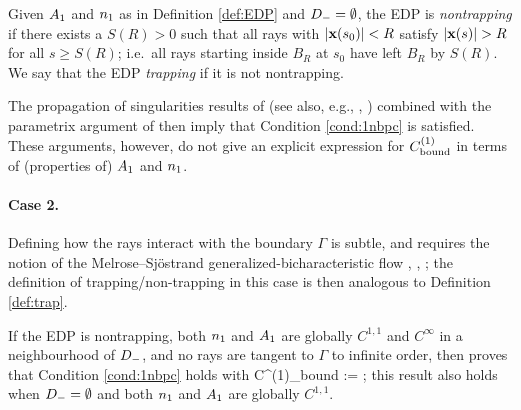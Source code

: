 \begin{definition}\label{def:trap}
Given $A_{1}$ and $n_{1}$ as in Definition \ref{def:EDP} and $D_{-}=\emptyset$, the EDP is \emph{nontrapping} if 
there exists a $S(R)>0$ such that all rays with $|\mathbf{x}(s_0)|<R$ satisfy $|\bx(s)|>R$ for all $s\geq S(R)$; i.e.~all rays starting inside $B_R$ at $s_0$ have left $B_R$ by $S(R)$. 
We say that the EDP \emph{trapping} if it is not nontrapping.
\end{definition}

The propagation of singularities results of \cite[\S VI]{DuHo:72} (see also, e.g., \cite[Chapter 24]{Ho:85}, \cite[\S12.3]{Zw:12}) combined with the parametrix argument of \cite{Va:75} then imply that Condition \ref{cond:1nbpc} is satisfied. These arguments, however, do not give an explicit expression for $C^{(1)}_{\rm bound}$ in terms of (properties of) $A_{1}$ and $n_{1}$.

\paragraph{Case 2.}
Defining how the rays interact with the boundary $\Gamma$ is subtle, and requires the notion of the Melrose--Sj{\"o}strand generalized-bicharacteristic flow 
\cite[\S24.3]{Ho:85}, \cite{MeSj:78}, \cite{MeSj:82}; the definition of trapping/non-trapping in this case \cite[Definition 7.20]{MeSj:82} is then analogous to Definition \ref{def:trap}.

If the EDP is nontrapping, both $n_{1}$ and $A_{1}$ are globally $C^{1,1}$ and $C^\infty$ in a neighbourhood of $D_{-}$, and no rays are tangent to $\Gamma$ to infinite order, 
then \cite[Theorem 2 and Equation 6.32]{GaSpWu:18} proves that Condition \ref{cond:1nbpc} holds with
\beqs
C^{(1)}_{\rm bound} :=   ;
\eeqs
this result also holds when $D_{-}=\emptyset$ and both $n_{1}$ and $A_{1}$ are globally $C^{1,1}$.

